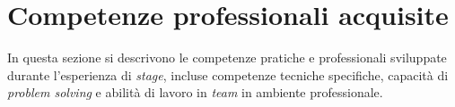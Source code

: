 \section{Competenze professionali acquisite}
In questa sezione si descrivono le competenze pratiche e professionali sviluppate durante l'esperienza di \textit{stage}, incluse competenze tecniche specifiche, capacità di \textit{problem solving} e abilità di lavoro in \textit{team} in ambiente professionale.